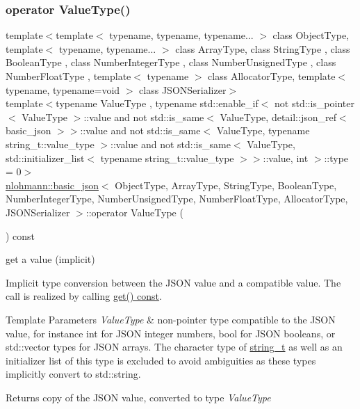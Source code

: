 \subsubsection{\texorpdfstring{operator Value\+Type()}{operator ValueType()}}
{\footnotesize\ttfamily template$<$template$<$ typename, typename, typename... $>$ class Object\+Type, template$<$ typename, typename... $>$ class Array\+Type, class String\+Type , class Boolean\+Type , class Number\+Integer\+Type , class Number\+Unsigned\+Type , class Number\+Float\+Type , template$<$ typename $>$ class Allocator\+Type, template$<$ typename, typename=void $>$ class J\+S\+O\+N\+Serializer$>$ \\
template$<$typename Value\+Type , typename std\+::enable\+\_\+if$<$ not std\+::is\+\_\+pointer$<$ Value\+Type $>$\+::value and not std\+::is\+\_\+same$<$ Value\+Type, detail\+::json\+\_\+ref$<$ basic\+\_\+json $>$$>$\+::value and not std\+::is\+\_\+same$<$ Value\+Type, typename string\+\_\+t\+::value\+\_\+type $>$\+::value and not std\+::is\+\_\+same$<$ Value\+Type, std\+::initializer\+\_\+list$<$ typename string\+\_\+t\+::value\+\_\+type $>$$>$\+::value, int $>$\+::type  = 0$>$ \\
\hyperlink{classnlohmann_1_1basic__json}{nlohmann\+::basic\+\_\+json}$<$ Object\+Type, Array\+Type, String\+Type, Boolean\+Type, Number\+Integer\+Type, Number\+Unsigned\+Type, Number\+Float\+Type, Allocator\+Type, J\+S\+O\+N\+Serializer $>$\+::operator Value\+Type (\begin{DoxyParamCaption}{ }\end{DoxyParamCaption}) const\hspace{0.3cm}{\ttfamily [inline]}}



get a value (implicit) 

Implicit type conversion between the J\+S\+ON value and a compatible value. The call is realized by calling \hyperlink{classnlohmann_1_1basic__json_a6b187a22994c12c8cae0dd5ee99dc85e}{get() const}.


\begin{DoxyTemplParams}{Template Parameters}
{\em Value\+Type} & non-\/pointer type compatible to the J\+S\+ON value, for instance {\ttfamily int} for J\+S\+ON integer numbers, {\ttfamily bool} for J\+S\+ON booleans, or {\ttfamily std\+::vector} types for J\+S\+ON arrays. The character type of \hyperlink{classnlohmann_1_1basic__json_a61f8566a1a85a424c7266fb531dca005}{string\+\_\+t} as well as an initializer list of this type is excluded to avoid ambiguities as these types implicitly convert to {\ttfamily std\+::string}.\\
\hline
\end{DoxyTemplParams}
\begin{DoxyReturn}{Returns}
copy of the J\+S\+ON value, converted to type {\itshape Value\+Type} 
\end{DoxyReturn}

